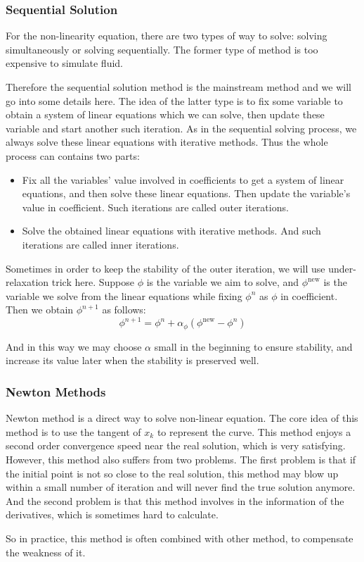\documentclass[english, nochinese]{pkupaper}
\begin{document}
\subsubsection{Sequential Solution}
\par For the non-linearity equation, there are two types of way to solve: solving simultaneously or solving sequentially. The former type of method is too expensive to simulate fluid. 
\par Therefore the sequential solution method is the mainstream method and we will go into some details here. The idea of the latter type is to fix some variable to obtain a system of linear equations which we can solve, then update these variable and start another such iteration. As in the sequential solving process, we always solve these linear equations with iterative methods. Thus the whole process can contains two parts:
\begin{itemize}
	\item Fix all the  variables' value involved in coefficients to get a system of linear equations, and then solve these linear equations. Then update the variable's value in coefficient. Such iterations are called outer iterations.
	\item Solve the obtained linear equations with iterative methods. And such iterations are called inner iterations.
\end{itemize}
\par Sometimes in order to keep the stability of the outer iteration, we will use under-relaxation trick here. Suppose $\phi$ is the variable we aim to solve, and $\phi^{\mathrm{new}}$ is the variable we solve from the linear equations while fixing $\phi^n$ as $\phi$ in coefficient. Then we obtain $\phi^{n+1}$ as follows:
\begin{equation}
	\phi^{n+1} = \phi^n + \alpha_\phi(\phi^{\mathrm{new}} - \phi^n)
\end{equation}
\par And in this way we may choose $\alpha$ small in the beginning to ensure stability, and increase its value later when the stability is preserved well.

\subsubsection{Newton Methods}
\par Newton method is a direct way to solve non-linear equation. The core idea of this method is to use the tangent of $x_k$ to represent the curve. This method enjoys a second order convergence speed near the real solution, which is very satisfying. However, this method also suffers from two problems. The first problem is that if the initial point is not so close to the real solution, this method may blow up within a small number of iteration and will never find the true solution anymore. And the second problem is that this method involves in the information of the derivatives, which is sometimes hard to calculate.
\par So in practice, this method is often combined with other method, to compensate the weakness of it.
\end{document}
